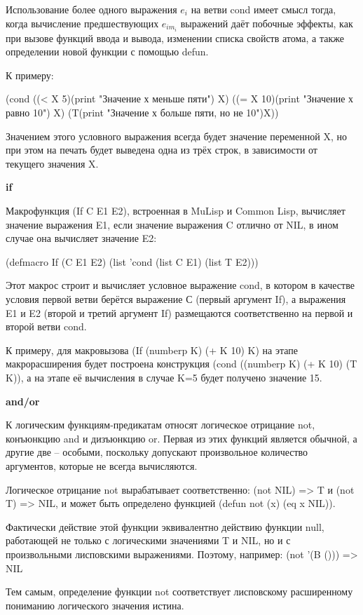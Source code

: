\documentclass[12pt]{report}
\begin{document}
	Использование более одного выражения $e_i$ на ветви cond имеет смысл тогда, когда вычисление предшествующих $e_{im_i}$ выражений даёт побочные эффекты, как при вызове функций ввода и вывода, изменении списка свойств атома, а также определении новой функции с помощью defun. 
	
	К примеру: 
	
	(cond ((< X 5)(print "Значение х меньше пяти") X)
	((= X 10)(print "Значение х равно 10") X)
	(T(print "Значение х больше пяти, но не 10")X))
	
	Значением этого условного выражения всегда будет значение переменной X, но при этом на печать будет выведена одна из трёх строк, в зависимости от текущего значения X.
	
	
	\textbf{if}
	
	Макрофункция (If C E1 E2), встроенная в MuLisp и Common Lisp, вычисляет значение выражения E1, если значение выражения C отлично от NIL, в ином случае она вычисляет значение E2:
	
	(defmacro If (C E1 E2) (list 'cond (list C E1) (list T E2)))
	
	Этот макрос строит и вычисляет условное выражение cond, в котором в качестве условия первой ветви берётся выражение С (первый аргумент If), а выражения E1 и E2 (второй и третий аргумент If) размещаются соответственно на первой и второй ветви cond.
	
	К примеру, для макровызова (If (numberp K) (+ K 10) K) на этапе макрорасширения будет построена конструкция (cond ((numberp K) (+ K 10) (T K)), а на этапе её вычисления в случае K=5 будет получено значение 15.
	
	\textbf{and/or}
	
	К логическим функциям-предикатам относят логическое отрицание not, конъюнкцию and и дизъюнкцию or. Первая из этих функций является обычной, а другие две – особыми, поскольку допускают произвольное количество аргументов, которые не всегда вычисляются. 
	
	Логическое отрицание not вырабатывает соответственно: (not NIL) => T и (not T) => NIL, и может быть определено функцией (defun not (x) (eq x NIL)).
	
	Фактически действие этой функции эквивалентно действию функции null, работающей не только с логическими значениями T и NIL, но и с  произвольными лисповскими выражениями. Поэтому, например: (not '(B ())) => NIL
	
	Тем самым, определение функции not соответствует лисповскому расширенному пониманию логического значения истина. 
	
\end{document}
